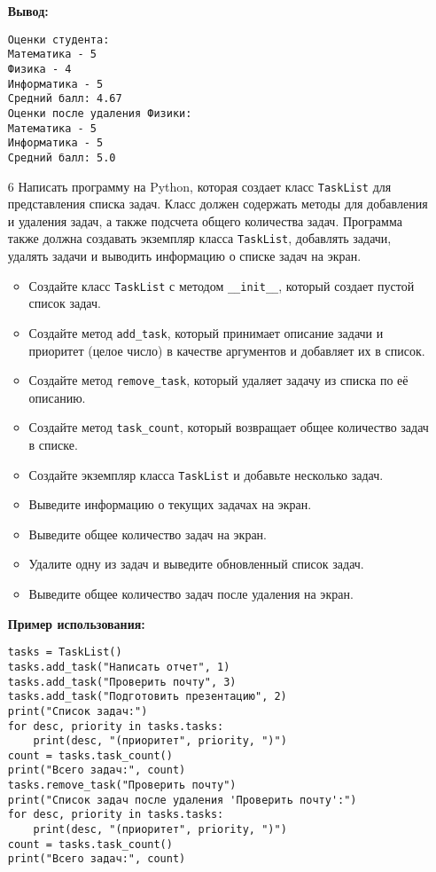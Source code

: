\begin{enumerate}
\textbf{Вывод:}
\begin{verbatim}
Оценки студента:
Математика - 5
Физика - 4
Информатика - 5
Средний балл: 4.67
Оценки после удаления Физики:
Математика - 5
Информатика - 5
Средний балл: 5.0
\end{verbatim}

\item[6] Написать программу на Python, которая создает класс \texttt{TaskList} для представления списка задач. Класс должен содержать методы для добавления и удаления задач, а также подсчета общего количества задач. Программа также должна создавать экземпляр класса \texttt{TaskList}, добавлять задачи, удалять задачи и выводить информацию о списке задач на экран.

\begin{itemize}
    \item Создайте класс \texttt{TaskList} с методом \texttt{\_\_init\_\_}, который создает пустой список задач.
    \item Создайте метод \texttt{add\_task}, который принимает описание задачи и приоритет (целое число) в качестве аргументов и добавляет их в список.
    \item Создайте метод \texttt{remove\_task}, который удаляет задачу из списка по её описанию.
    \item Создайте метод \texttt{task\_count}, который возвращает общее количество задач в списке.
    \item Создайте экземпляр класса \texttt{TaskList} и добавьте несколько задач.
    \item Выведите информацию о текущих задачах на экран.
    \item Выведите общее количество задач на экран.
    \item Удалите одну из задач и выведите обновленный список задач.
    \item Выведите общее количество задач после удаления на экран.
\end{itemize}

\textbf{Пример использования:}

\begin{verbatim}
tasks = TaskList()
tasks.add_task("Написать отчет", 1)
tasks.add_task("Проверить почту", 3)
tasks.add_task("Подготовить презентацию", 2)
print("Список задач:")
for desc, priority in tasks.tasks:
    print(desc, "(приоритет", priority, ")")
count = tasks.task_count()
print("Всего задач:", count)
tasks.remove_task("Проверить почту")
print("Список задач после удаления 'Проверить почту':")
for desc, priority in tasks.tasks:
    print(desc, "(приоритет", priority, ")")
count = tasks.task_count()
print("Всего задач:", count)
\end{verbatim}


\end{enumerate}
